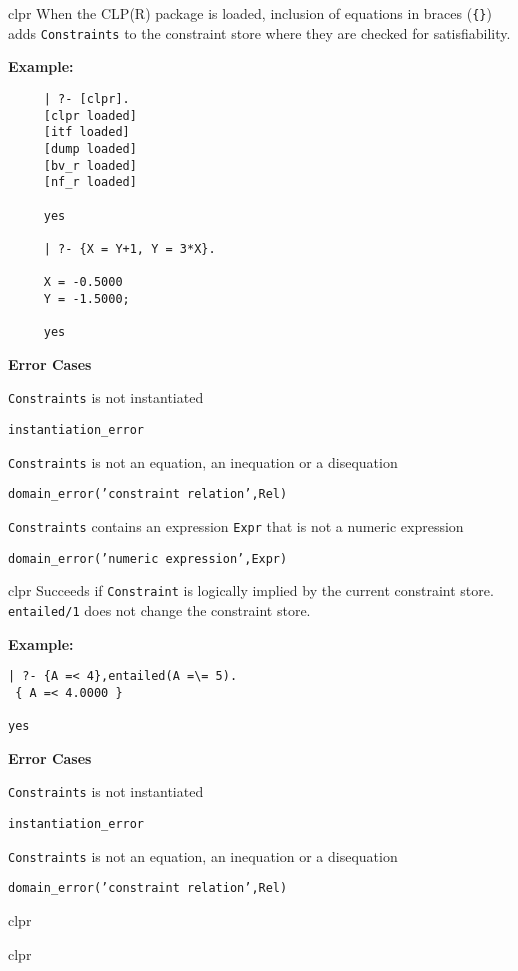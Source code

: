 \begin{description}
 {clpr} 
%
When the CLP(R) package is loaded, inclusion of equations in braces
({\tt \{\}}) adds {\tt Constraints} to the constraint store where they
are checked for satisfiability. 

{\bf Example:}
{\small
\begin{verbatim}
     | ?- [clpr].
     [clpr loaded]
     [itf loaded]
     [dump loaded]
     [bv_r loaded]
     [nf_r loaded]

     yes

     | ?- {X = Y+1, Y = 3*X}.

     X = -0.5000
     Y = -1.5000;

     yes
\end{verbatim}
}
{\bf Error Cases}
\bi
\item 	{\tt Constraints} is not instantiated
\bi
\item 	{\tt instantiation\_error}
\ei
%
\item 	{\tt Constraints} is not an equation, an inequation or a disequation
\bi
\item 	{\tt domain\_error('constraint relation',Rel)}
\ei
\item {\tt Constraints} contains an expression {\tt Expr} that is not
  a numeric expression 
\bi
\item 	{\tt domain\_error('numeric expression',Expr)}
\ei
\ei

 {clpr} 
%
Succeeds if {\tt Constraint} is logically implied by the current
constraint store.  {\tt entailed/1} does not change the constraint
store.
%

{\bf Example:}
{\small
\begin{verbatim}
| ?- {A =< 4},entailed(A =\= 5).
 { A =< 4.0000 }

yes   
\end{verbatim}
}
{\bf Error Cases}
\bi
\item 	{\tt Constraints} is not instantiated
\bi
\item 	{\tt instantiation\_error}
\ei
%
\item 	{\tt Constraints} is not an equation, an inequation or a disequation
\bi
\item 	{\tt domain\_error('constraint relation',Rel)}
\ei
\ei

 {clpr} 

 {clpr} 


\end{description}
